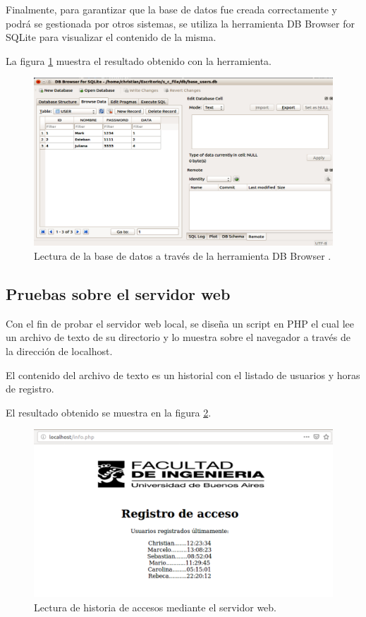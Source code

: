 Finalmente, para garantizar que la base de datos fue creada correctamente y podrá se gestionada por otros sistemas, se utiliza la herramienta DB Browser for SQLite para visualizar el contenido de la misma.

La figura \ref{fig:browser} muestra el resultado obtenido con la herramienta.

\begin{figure}[H]
	\centering
	\includegraphics[scale=.3]{./Figures/browser.png}
	\caption{Lectura de la base de datos a través de la herramienta DB Browser .}
	\label{fig:browser}
\end{figure}


\subsection{Pruebas sobre el servidor web}

Con el fin de probar el servidor web local, se diseña un script en PHP el cual lee un archivo de texto de su directorio y lo muestra sobre el navegador a través de la dirección de localhost.

El contenido del archivo de texto es un historial con el listado de usuarios y horas de registro.

El resultado obtenido se muestra en la figura \ref{fig:web}.

\begin{figure}[h]
	\centering
	\includegraphics[scale=.3]{./Figures/web.png}
	\caption{Lectura de historia de accesos mediante el servidor web.}
	\label{fig:web}
\end{figure}


